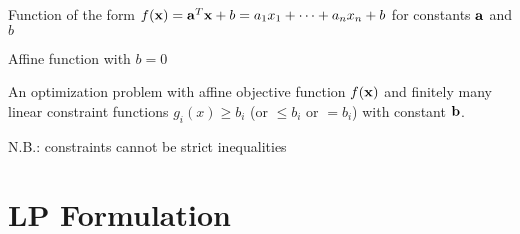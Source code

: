 \begin{defn}
  Function of the form $f(\vb x) = \vb a^T \vb x + b = a_1x_1 + \dotsb + a_nx_n + b$ for constants $\vb a$ and $b$
\end{defn}

\begin{defn}
  Affine function with $b=0$
\end{defn}

\begin{defn}
  An optimization problem with affine objective function $f(\vb x)$ and finitely many linear constraint functions $g_i(x) \geq b_i$ (or $\leq b_i$ or $= b_i$) with constant $\vb b$.

  N.B.: constraints cannot be strict inequalities
\end{defn}

\section{LP Formulation}

